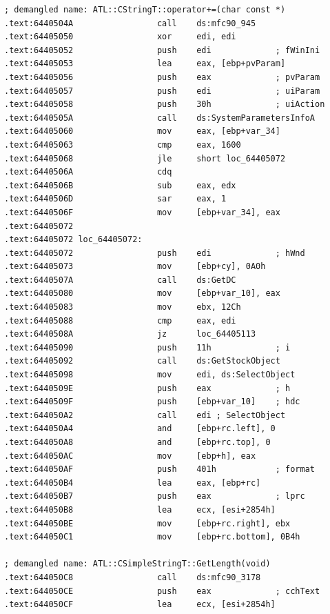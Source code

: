 \begin{lstlisting}
; demangled name: ATL::CStringT::operator+=(char const *)
.text:6440504A                 call    ds:mfc90_945
.text:64405050                 xor     edi, edi
.text:64405052                 push    edi             ; fWinIni
.text:64405053                 lea     eax, [ebp+pvParam]
.text:64405056                 push    eax             ; pvParam
.text:64405057                 push    edi             ; uiParam
.text:64405058                 push    30h             ; uiAction
.text:6440505A                 call    ds:SystemParametersInfoA
.text:64405060                 mov     eax, [ebp+var_34]
.text:64405063                 cmp     eax, 1600
.text:64405068                 jle     short loc_64405072
.text:6440506A                 cdq
.text:6440506B                 sub     eax, edx
.text:6440506D                 sar     eax, 1
.text:6440506F                 mov     [ebp+var_34], eax
.text:64405072
.text:64405072 loc_64405072:
.text:64405072                 push    edi             ; hWnd
.text:64405073                 mov     [ebp+cy], 0A0h
.text:6440507A                 call    ds:GetDC
.text:64405080                 mov     [ebp+var_10], eax
.text:64405083                 mov     ebx, 12Ch
.text:64405088                 cmp     eax, edi
.text:6440508A                 jz      loc_64405113
.text:64405090                 push    11h             ; i
.text:64405092                 call    ds:GetStockObject
.text:64405098                 mov     edi, ds:SelectObject
.text:6440509E                 push    eax             ; h
.text:6440509F                 push    [ebp+var_10]    ; hdc
.text:644050A2                 call    edi ; SelectObject
.text:644050A4                 and     [ebp+rc.left], 0
.text:644050A8                 and     [ebp+rc.top], 0
.text:644050AC                 mov     [ebp+h], eax
.text:644050AF                 push    401h            ; format
.text:644050B4                 lea     eax, [ebp+rc]
.text:644050B7                 push    eax             ; lprc
.text:644050B8                 lea     ecx, [esi+2854h]
.text:644050BE                 mov     [ebp+rc.right], ebx
.text:644050C1                 mov     [ebp+rc.bottom], 0B4h

; demangled name: ATL::CSimpleStringT::GetLength(void)
.text:644050C8                 call    ds:mfc90_3178
.text:644050CE                 push    eax             ; cchText
.text:644050CF                 lea     ecx, [esi+2854h]


\end{lstlisting}
